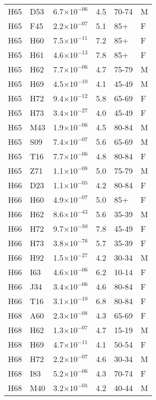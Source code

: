\begin{longtable}{lllrll}
   H65 & D53 & 6.7$\times10^{-06}$ & 4.5 & 70-74 & M \\ 
   H65 & F45 & 2.2$\times10^{-07}$ & 5.1 & 85+ & F \\ 
   H65 & H60 & 7.5$\times10^{-11}$ & 7.2 & 85+ & F \\ 
   H65 & H61 & 4.6$\times10^{-13}$ & 7.8 & 85+ & F \\ 
   H65 & H62 & 7.7$\times10^{-06}$ & 4.7 & 75-79 & M \\ 
   H65 & H69 & 4.5$\times10^{-10}$ & 4.1 & 45-49 & M \\ 
   H65 & H72 & 9.4$\times10^{-12}$ & 5.8 & 65-69 & F \\ 
   H65 & H73 & 3.4$\times10^{-27}$ & 4.0 & 45-49 & F \\ 
   H65 & M43 & 1.9$\times10^{-06}$ & 4.5 & 80-84 & M \\ 
   H65 & S09 & 7.4$\times10^{-07}$ & 5.6 & 65-69 & M \\ 
   H65 & T16 & 7.7$\times10^{-06}$ & 4.8 & 80-84 & F \\ 
   H65 & Z71 & 1.1$\times10^{-08}$ & 5.0 & 75-79 & M \\ 
   H66 & D23 & 1.1$\times10^{-05}$ & 4.2 & 80-84 & F \\ 
   H66 & H60 & 4.9$\times10^{-07}$ & 5.0 & 85+ & F \\ 
   H66 & H62 & 8.6$\times10^{-43}$ & 5.6 & 35-39 & M \\ 
   H66 & H72 & 9.7$\times10^{-50}$ & 7.8 & 45-49 & F \\ 
   H66 & H73 & 3.8$\times10^{-76}$ & 5.7 & 35-39 & F \\ 
   H66 & H92 & 1.5$\times10^{-27}$ & 4.2 & 30-34 & M \\ 
   H66 & I63 & 4.6$\times10^{-06}$ & 6.2 & 10-14 & F \\ 
   H66 & J34 & 3.4$\times10^{-06}$ & 4.6 & 80-84 & F \\ 
   H66 & T16 & 3.1$\times10^{-10}$ & 6.8 & 80-84 & F \\ 
   H68 & A60 & 2.3$\times10^{-08}$ & 4.3 & 65-69 & F \\ 
   H68 & H62 & 1.3$\times10^{-07}$ & 4.7 & 15-19 & M \\ 
   H68 & H69 & 4.7$\times10^{-11}$ & 4.1 & 50-54 & F \\ 
   H68 & H72 & 2.2$\times10^{-07}$ & 4.6 & 30-34 & M \\ 
   H68 & I83 & 5.2$\times10^{-06}$ & 4.3 & 70-74 & F \\ 
   H68 & M40 & 3.2$\times10^{-05}$ & 4.2 & 40-44 & M \\ 

\end{longtable}
